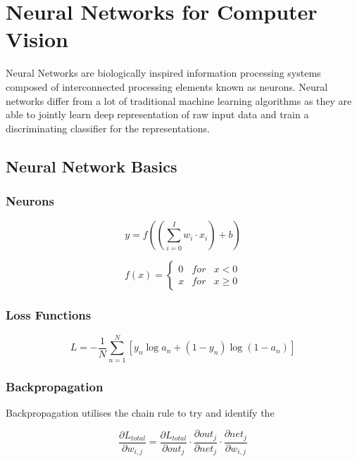 \section{Neural Networks for Computer Vision}
\label{sec:ann_for_cv}
Neural Networks are biologically inspired information processing systems composed of interconnected processing elements known as neurons. Neural networks differ from a lot of traditional machine learning algorithms as they are able to jointly learn deep representation of raw input data and train a discriminating classifier for the representations. 


\subsection{Neural Network Basics}
\label{subsec:neural_network_basics}

\subsubsection{Neurons}

\begin{equation}
	y = f\left ( \left ( \sum_{i=0}^{I} w_i \cdot x_i \right ) + b \right )
	\label{eq:neuron}
\end{equation}

\begin{equation}
	f(x)=\left\{\begin{matrix}
		0 & for & x < 0 \\ 
		x & for & x \geq 0
	\end{matrix}\right.
	\label{eq:relu}
\end{equation}


\subsubsection{Loss Functions}

\begin{equation}
	L = -\frac{1}{N}\sum^N_{n=1}\left [ y_n\log a_n + (1-y_n)\log(1-a_n) \right ]
	\label{eq:cross_entropy}
\end{equation}


\subsubsection{Backpropagation}
Backpropagation utilises the chain rule to try and identify the 

\begin{equation}
	\frac{\partial L_{total}}{\partial w_{i,j}} = \frac{\partial L_{total}}{\partial out_j} \cdot \frac{\partial out_j}{\partial net_j} \cdot \frac{\partial net_j}{\partial w_{i,j}}
	\label{eq:backpropagation}
\end{equation}


